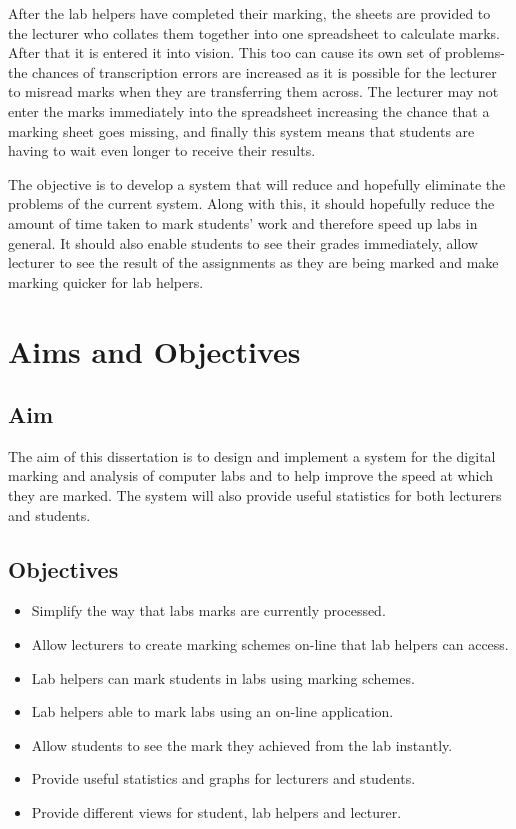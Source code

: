 \documentclass[12pt]{article}  %
\begin{document}
After the lab helpers have completed their marking, the sheets are provided to the lecturer who collates them together into one spreadsheet to calculate marks. After that it is entered it into vision. This too can cause its own set of problems-the chances of transcription errors are increased as it is possible for the lecturer to misread marks when they are transferring them across. The lecturer may not enter the marks immediately into the spreadsheet increasing the chance that a marking sheet goes missing, and finally this system means that students are having to wait even longer to receive their results.

The objective is to develop a system that will reduce and hopefully eliminate the problems of the current system. Along with this, it should hopefully reduce the amount of time taken to mark students’ work and therefore speed up labs in general. It should also enable students to see their grades immediately, allow lecturer to see the result of the assignments as they are being marked and make marking quicker for lab helpers.




\newpage
\section{Aims and Objectives}
\subsection{Aim}
The aim of this dissertation is to design and implement a system for the digital marking and analysis of computer labs and to help improve the speed at which they are marked. The system will also provide useful statistics for both lecturers and students.

\subsection{Objectives}
\label{section:object}
\begin{itemize}
\item Simplify the way that labs marks are currently processed.
\item Allow lecturers to create marking schemes on-line that lab helpers can access. 
\item Lab helpers can mark students in labs using marking schemes.
\item Lab helpers able  to mark labs using an on-line application.
\item Allow students to see the mark they achieved from the lab instantly.
\item Provide useful statistics and graphs for lecturers and students.
\item Provide different views for student, lab helpers and lecturer.
\end{itemize}
\end{document}
